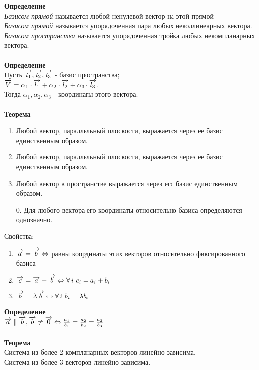 \documentclass[12pt]{article}
\begin{document}
\textbf{Определение}\\
\textit{Базисом прямой} называется любой ненулевой вектор на этой прямой\\
\textit{Базисом прямой} называется упорядоченная пара любых неколлинеарных вектора.\\
\textit{Базисом пространства} называется упорядоченная тройка любых некомпланарных вектора.\\\\
\textbf{Определение}\\
Пусть $\overrightarrow{l_1},\overrightarrow{l_2},\overrightarrow{l_3}$ - базис пространства;\\
$\overrightarrow{V} = \alpha_1\cdot\overrightarrow{l_1}+\alpha_2\cdot\overrightarrow{l_2}+\alpha_3\cdot\overrightarrow{l_3}$.\\Тогда $\alpha_1,\alpha_2,\alpha_3$ - координаты этого вектора.\\\\
\textbf{Теорема}
\begin{enumerate}
    \item Любой вектор, параллельный плоскости, выражается через ее базис единственным образом. 
    \item Любой вектор, параллельный плоскости, выражается через ее базис единственным образом. 
    \item Любой вектор в пространстве выражается через его базис единственным образом.
    \item[0.] Для любого вектора его координаты относительно базиса определяются однозначно.
\end{enumerate}
Свойства:
\begin{enumerate}
    \item $\overrightarrow{a} = \overrightarrow{b} \Leftrightarrow $ равны координаты этих векторов относительно фиксированного базиса
    \item $\overrightarrow{c}=\overrightarrow{a}+\overrightarrow{b} \Leftrightarrow \forall\,i\ c_i=a_i+b_i$
    \item $\overrightarrow{b}=\lambda\overrightarrow{b} \Leftrightarrow \forall\,i\ b_i=\lambda b_i$
\end{enumerate}
\textbf{Определение}\\
$\overrightarrow{a}\parallel\overrightarrow{b}, \overrightarrow{b} \neq \overrightarrow{0} \Leftrightarrow \frac{a_1}{b_1}=\frac{a_2}{b_2}=\frac{a_3}{b_3}$\\\\
\textbf{Теорема}\\
Система из более 2 компланарных векторов линейно зависима.\\
Система из более 3 векторов линейно зависима.
\end{document}

